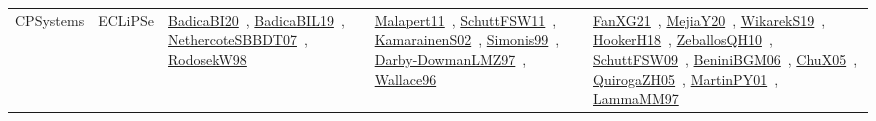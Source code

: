 {\begin{longtable}{lp{3cm}>{\raggedright\arraybackslash}p{6cm}>{\raggedright\arraybackslash}p{6cm}>{\raggedright\arraybackslash}p{8cm}}
CPSystems & ECLiPSe & \href{works/BadicaBI20.pdf}{BadicaBI20}~\cite{BadicaBI20}, \href{works/BadicaBIL19.pdf}{BadicaBIL19}~\cite{BadicaBIL19}, \href{works/NethercoteSBBDT07.pdf}{NethercoteSBBDT07}~\cite{NethercoteSBBDT07}, \href{works/RodosekW98.pdf}{RodosekW98}~\cite{RodosekW98} & \href{works/Malapert11.pdf}{Malapert11}~\cite{Malapert11}, \href{works/SchuttFSW11.pdf}{SchuttFSW11}~\cite{SchuttFSW11}, \href{works/KamarainenS02.pdf}{KamarainenS02}~\cite{KamarainenS02}, \href{works/Simonis99.pdf}{Simonis99}~\cite{Simonis99}, \href{works/Darby-DowmanLMZ97.pdf}{Darby-DowmanLMZ97}~\cite{Darby-DowmanLMZ97}, \href{works/Wallace96.pdf}{Wallace96}~\cite{Wallace96} & \href{works/FanXG21.pdf}{FanXG21}~\cite{FanXG21}, \href{works/MejiaY20.pdf}{MejiaY20}~\cite{MejiaY20}, \href{works/WikarekS19.pdf}{WikarekS19}~\cite{WikarekS19}, \href{works/HookerH18.pdf}{HookerH18}~\cite{HookerH18}, \href{works/ZeballosQH10.pdf}{ZeballosQH10}~\cite{ZeballosQH10}, \href{works/SchuttFSW09.pdf}{SchuttFSW09}~\cite{SchuttFSW09}, \href{works/BeniniBGM06.pdf}{BeniniBGM06}~\cite{BeniniBGM06}, \href{works/ChuX05.pdf}{ChuX05}~\cite{ChuX05}, \href{works/QuirogaZH05.pdf}{QuirogaZH05}~\cite{QuirogaZH05}, \href{works/MartinPY01.pdf}{MartinPY01}~\cite{MartinPY01}, \href{works/LammaMM97.pdf}{LammaMM97}~\cite{LammaMM97}\\

\end{longtable}}
